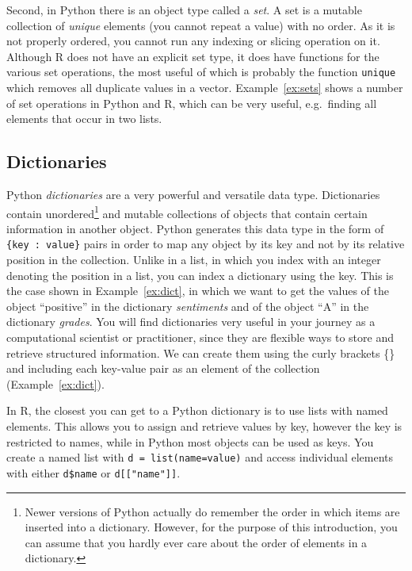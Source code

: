 Second, in Python there is an object type called a \emph{set}.
A set is a mutable collection of \emph{unique} elements (you cannot repeat a value) with
no order. As it is not properly ordered, you cannot run any indexing
or slicing operation on it.
Although R does not have an explicit set type,
it does have functions for the various set operations,
the most useful of which is probably the function \texttt{unique} which removes all duplicate values in a vector.
Example~\ref{ex:sets} shows a number of set operations in Python and R,
which can be very useful,  e.g.\ finding all elements that occur in two lists.


\subsection{Dictionaries}\label{sec:dictionaries}

Python \emph{dictionaries} are a very powerful and versatile data type.
Dictionaries contain unordered\footnote{Newer versions of Python actually do remember the order in which items are inserted into a dictionary. However, for the purpose of this introduction, you can assume that you hardly ever care about the order of elements in a dictionary.} and mutable collections of objects that
contain certain information in another object. Python generates this
data type in the form of \verb|{key : value}| pairs in order
to map any object by its key and not by its relative position in the
collection. Unlike in a list, in which you index with an integer denoting
the position in a list, you can index a dictionary using the key.
This is the case shown in Example~\ref{ex:dict}, in which we want to get the values of the object ``positive'' in the
dictionary \emph{sentiments} and of the object ``A'' in the dictionary
\emph{grades}. You will
find dictionaries very useful in your journey as a computational
scientist or practitioner, since they are flexible ways to store and
retrieve structured information. We can create them using the curly
brackets \{\} and including each key-value pair as an element of the
collection (Example~\ref{ex:dict}).

In R, the closest you can get to a Python dictionary is to use lists with named elements.
This allows you to assign and retrieve values by key,
however the key is restricted to names, while in Python most objects can be used as keys.
You create a named list with \verb|d = list(name=value)| and access individual elements with either
\verb|d$name| or \verb|d[["name"]]|.

